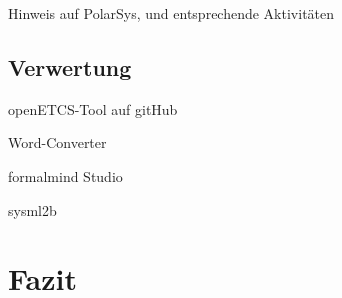 \documentclass[twoside]{article}
\begin{document}
\begin{multicols}{2}
Hinweis auf PolarSys, und entsprechende Aktivitäten

\subsection{Verwertung}

openETCS-Tool auf gitHub

Word-Converter

formalmind Studio

sysml2b

\section{Fazit}


\end{multicols}

\titleformat{\section}[block]{\large\scshape\centering{}}{}{1em}{}



\end{document}
